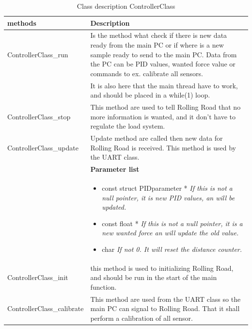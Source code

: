 \begin{table}[H]
	\centering
	\begin{tabular}{|p{5 cm}|p{10 cm}|}
		\hline
		\textbf{methods} & \textbf{Description} \\ \hline
		
		ControllerClass\_run
		& Is the method what check if there is new data ready from the main PC or if where is a new sample ready to send to the main PC. Data from the PC can be PID values, wanted force value or commands to ex. calibrate all sensors. 
		\\ & It is also here that the main thread have to work, and should be placed in a while(1) loop. \\ 
		\hline
		
		ControllerClass\_stop
		& This method are used to tell Rolling Road that no more information is wanted, and it don't have to regulate the load system. 
		\\ \hline
		
		ControllerClass\_update
		& Update method are called then new data for Rolling Road is received. This method is used by the UART class.
		\\ & \textbf{Parameter list}
		\\ & \begin{itemize}
			\item {\large const struct PIDparameter *}
			\subitem \textit{If this is not a null pointer, it is new PID values, an will be updated.}
			\item {\large const float *}
			\subitem \textit{If this is not a null pointer, it is a new wanted force an will update the old value.}
			\item {\large char}
			\subitem \textit{If not 0. It will reset the distance counter.}
		\end{itemize}
		\\ \hline
		
		ControllerClass\_init
		& this method is used to initializing Rolling Road, and should be run in the start of the main function.  
		\\ \hline
		
		ControllerClass\_calibrate
		& This method are used from the UART class so the main PC can signal to Rolling Road. That it shall perform a calibration of all sensor.
		\\ \hline
	\end{tabular}
	\caption{Class description ControllerClass}
	\label{table:Class_description_ControllerClass_RR_PSoC}
\end{table}

